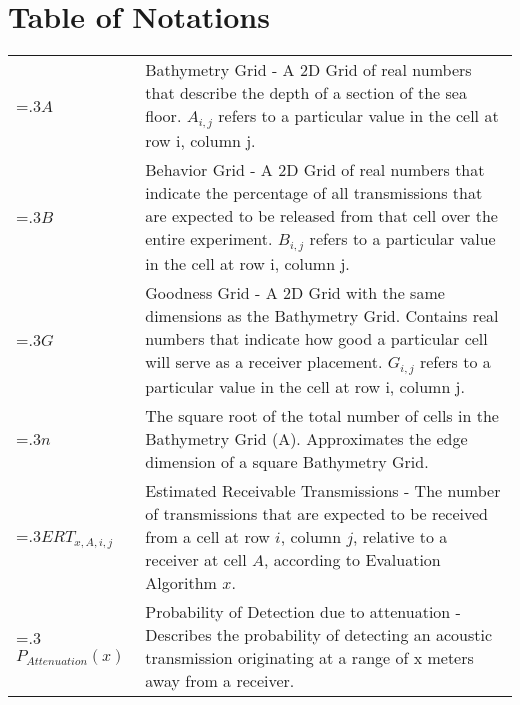 
\chapter{Table of Notations}
\noindent\begin{tabularx}{\linewidth}{@{}>{\hsize=.3\hsize}X>{\hsize=1.5\hsize}X@{}}
	
	$A$ & Bathymetry Grid - A 2D Grid of real numbers that describe the depth of a section of the sea floor.  $A_{i,j}$ refers to a particular value in the cell at row i, column j.\\

	$B$ & Behavior Grid - A 2D Grid of real numbers that indicate the percentage of all transmissions that are expected to be released from that cell over the entire experiment.  $B_{i,j}$ refers to a particular value in the cell at row i, column j.\\
	
	$G$ & Goodness Grid - A 2D Grid with the same dimensions as the Bathymetry Grid.  Contains real numbers that indicate how good a particular cell will serve as a receiver placement.  $G_{i,j}$ refers to a particular value in the cell at row i, column j.\\

	$n$ & The square root of the total number of cells in the Bathymetry Grid (A).  Approximates the edge dimension of a square Bathymetry Grid.\\

	$ERT_{x,A,i,j}$ & Estimated Receivable Transmissions - The number of transmissions that are expected to be received from a cell at row $i$, column $j$, relative to a receiver at cell $A$, according to Evaluation Algorithm $x$.\\

	$P_{Attenuation}(x)$ & Probability of Detection due to attenuation - Describes the probability of detecting an acoustic transmission originating at a range of x meters away from a receiver.\\
	

\end{tabularx}
